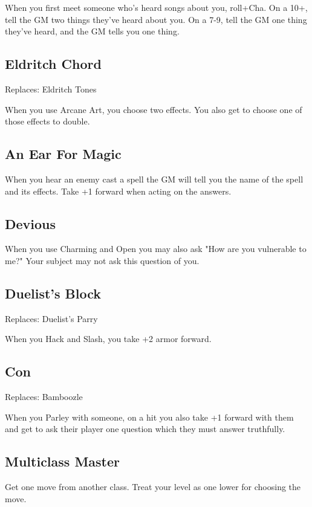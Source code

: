 When you first meet someone who's heard songs about you, roll+Cha. On a 10+, tell the GM two things they've heard about you. On a 7-9, tell the GM one thing they've heard, and the GM tells you one thing.

 
\subsection{Eldritch Chord}    
 

Replaces: Eldritch Tones

 

When you use Arcane Art, you choose two effects. You also get to choose one of those effects to double.

 
\subsection{An Ear For Magic}    
 

When you hear an enemy cast a spell the GM will tell you the name of the spell and its effects. Take +1 forward when acting on the answers.

 
\subsection{Devious}   
 

When you use Charming and Open you may also ask "How are you vulnerable to me?" Your subject may not ask this question of you.

 
\subsection{Duelist's Block}    
 

Replaces: Duelist's Parry

 

When you Hack and Slash, you take +2 armor forward.

 
\subsection{Con}   
 

Replaces: Bamboozle

 

When you Parley with someone, on a hit you also take +1 forward with them and get to ask their player one question which they must answer truthfully.

 
\subsection{Multiclass Master}    
 

Get one move from another class. Treat your level as one lower for choosing the move.










